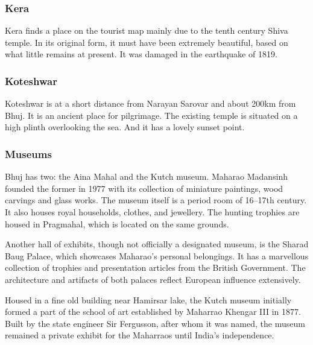 \subsubsection{Kera} %
\label{ssub:kera}

Kera finds a place on the tourist map mainly due to the tenth century Shiva temple. In its original form, it must have been extremely beautiful, based on what little remains at present. It was damaged in the earthquake of 1819.


\subsubsection{Koteshwar} %
\label{ssub:koteshwar}

Koteshwar is at a short distance from Narayan Sarovar and about 200km from Bhuj. It is an ancient place for pilgrimage. The existing temple is situated on a high plinth overlooking the sea. And it has a lovely sunset point.


\subsubsection{Museums} %
\label{ssub:museums}

Bhuj has two: the Aina Mahal and the Kutch museum. Maharao Madansinh founded the former in 1977 with its collection of miniature paintings, wood carvings and glass works. The museum itself is a period room of 16--17th century. It also houses royal households, clothes, and jewellery. The hunting trophies are housed in Pragmahal, which is located on the same grounds.

Another hall of exhibits, though not officially a designated museum, is the Sharad Baug Palace, which showcases Maharao's personal belongings. It has a marvellous collection of trophies and presentation articles from the British Government. The architecture and artifacts of both palaces reflect European influence extensively.

Housed in a fine old building near Hamirsar lake, the Kutch museum initially formed a part of the school of art established by Maharrao Khengar III in 1877. Built by the state engineer Sir Fergusson, after whom it was named, the museum remained a private exhibit for the Maharraos until India's independence.


